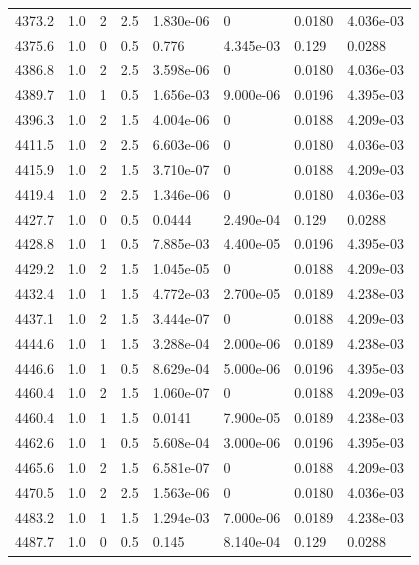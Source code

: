 \documentclass[preview]{standalone}
\begin{document}
{{{{{{{{{{{{{{{{{\begin{tabular}{L{1.2cm}C{1.2cm} C{0.3cm}C{0.5cm} C{1.4cm}C{1.4cm} C{1.4cm}C{1.4cm}}
  4373.2  &   1.0  & 2     & 2.5 &  1.830e-06  & 0  & 0.0180 &  4.036e-03   \\ 
  4375.6  &   1.0  & 0     & 0.5 &  0.776  & 4.345e-03  & 0.129 &  0.0288   \\ 
  4386.8  &   1.0  & 2     & 2.5 &  3.598e-06  & 0  & 0.0180 &  4.036e-03   \\ 
  4389.7  &   1.0  & 1     & 0.5 &  1.656e-03  & 9.000e-06  & 0.0196 &  4.395e-03   \\ 
  4396.3  &   1.0  & 2     & 1.5 &  4.004e-06  & 0  & 0.0188 &  4.209e-03   \\ 
  4411.5  &   1.0  & 2     & 2.5 &  6.603e-06  & 0  & 0.0180 &  4.036e-03   \\ 
  4415.9  &   1.0  & 2     & 1.5 &  3.710e-07  & 0  & 0.0188 &  4.209e-03   \\ 
  4419.4  &   1.0  & 2     & 2.5 &  1.346e-06  & 0  & 0.0180 &  4.036e-03   \\ 
  4427.7  &   1.0  & 0     & 0.5 &  0.0444  & 2.490e-04  & 0.129 &  0.0288   \\ 
  4428.8  &   1.0  & 1     & 0.5 &  7.885e-03  & 4.400e-05  & 0.0196 &  4.395e-03   \\ 
  4429.2  &   1.0  & 2     & 1.5 &  1.045e-05  & 0  & 0.0188 &  4.209e-03   \\ 
  4432.4  &   1.0  & 1     & 1.5 &  4.772e-03  & 2.700e-05  & 0.0189 &  4.238e-03   \\ 
  4437.1  &   1.0  & 2     & 1.5 &  3.444e-07  & 0  & 0.0188 &  4.209e-03   \\ 
  4444.6  &   1.0  & 1     & 1.5 &  3.288e-04  & 2.000e-06  & 0.0189 &  4.238e-03   \\ 
  4446.6  &   1.0  & 1     & 0.5 &  8.629e-04  & 5.000e-06  & 0.0196 &  4.395e-03   \\ 
  4460.4  &   1.0  & 2     & 1.5 &  1.060e-07  & 0  & 0.0188 &  4.209e-03   \\ 
  4460.4  &   1.0  & 1     & 1.5 &  0.0141  & 7.900e-05  & 0.0189 &  4.238e-03   \\ 
  4462.6  &   1.0  & 1     & 0.5 &  5.608e-04  & 3.000e-06  & 0.0196 &  4.395e-03   \\ 
  4465.6  &   1.0  & 2     & 1.5 &  6.581e-07  & 0  & 0.0188 &  4.209e-03   \\ 
  4470.5  &   1.0  & 2     & 2.5 &  1.563e-06  & 0  & 0.0180 &  4.036e-03   \\ 
  4483.2  &   1.0  & 1     & 1.5 &  1.294e-03  & 7.000e-06  & 0.0189 &  4.238e-03   \\ 
  4487.7  &   1.0  & 0     & 0.5 &  0.145  & 8.140e-04  & 0.129 &  0.0288   \\ 

\end{tabular}}}}}}}}}}}}}}}}}}
\end{document}
